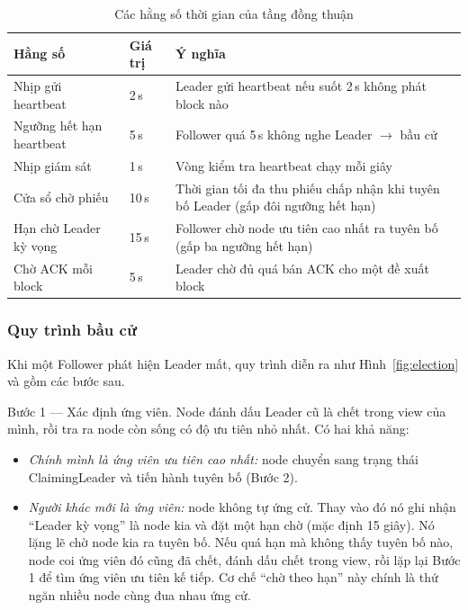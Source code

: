 \begin{table}[H]
\centering
\caption{Các hằng số thời gian của tầng đồng thuận}
\label{tab:timing}
\begin{tabular}{@{}p{4.3cm}p{2.2cm}p{6cm}@{}}
\toprule
\textbf{Hằng số} & \textbf{Giá trị} & \textbf{Ý nghĩa} \\
\midrule
Nhịp gửi heartbeat & 2\,s & Leader gửi heartbeat nếu suốt 2\,s không phát block nào \\
Ngưỡng hết hạn heartbeat & 5\,s & Follower quá 5\,s không nghe Leader $\rightarrow$ bầu cử \\
Nhịp giám sát & 1\,s & Vòng kiểm tra heartbeat chạy mỗi giây \\
Cửa sổ chờ phiếu & 10\,s & Thời gian tối đa thu phiếu chấp nhận khi tuyên bố Leader (gấp đôi ngưỡng hết hạn) \\
Hạn chờ Leader kỳ vọng & 15\,s & Follower chờ node ưu tiên cao nhất ra tuyên bố (gấp ba ngưỡng hết hạn) \\
Chờ ACK mỗi block & 5\,s & Leader chờ đủ quá bán ACK cho một đề xuất block \\
\bottomrule
\end{tabular}
\end{table}

\subsubsection{Quy trình bầu cử}

Khi một Follower phát hiện Leader mất, quy trình diễn ra như Hình~\ref{fig:election}
và gồm các bước sau.

Bước 1 --- Xác định ứng viên. Node đánh dấu Leader cũ là chết trong view
của mình, rồi tra ra node còn sống có độ ưu tiên nhỏ nhất. Có hai khả năng:

\begin{itemize}
  \item \textit{Chính mình là ứng viên ưu tiên cao nhất:} node chuyển sang trạng
  thái ClaimingLeader và tiến hành tuyên bố (Bước 2).
  \item \textit{Người khác mới là ứng viên:} node không tự ứng cử. Thay
  vào đó nó ghi nhận ``Leader kỳ vọng'' là node kia và đặt một hạn chờ (mặc định
  15 giây). Nó lặng lẽ chờ node kia ra tuyên bố. Nếu quá hạn mà không thấy tuyên
  bố nào, node coi ứng viên đó cũng đã chết, đánh dấu chết trong view, rồi lặp lại
  Bước 1 để tìm ứng viên ưu tiên kế tiếp. Cơ chế ``chờ theo hạn'' này chính là thứ
  ngăn nhiều node cùng đua nhau ứng cử.
\end{itemize}

